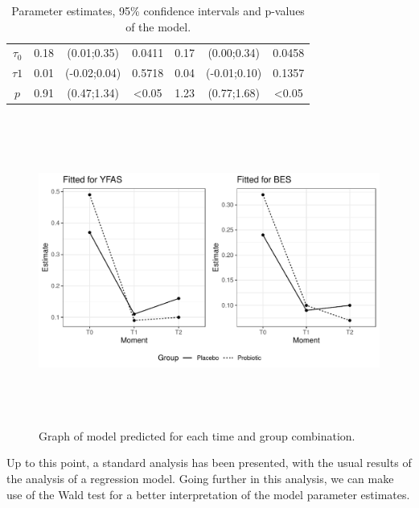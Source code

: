\documentclass[AMA,STIX1COL]{WileyNJD-v2}
\begin{document}
\begin{table}[h]
\begin{tabular}{c|cccccc}
$\tau_0$                   & 0.18       & (0.01;0.35)                                                       & \multicolumn{1}{c|}{0.0411} & 0.17       & (0.00;0.34)                                                       & 0.0458           \\
$\tau1$                    & 0.01       & (-0.02;0.04)                                                      & \multicolumn{1}{c|}{0.5718}           & 0.04       & (-0.01;0.10)                                                      & 0.1357           \\
$p$                        & 0.91       & (0.47;1.34)                                                       & \multicolumn{1}{c|}{\textless 0.05} & 1.23       & (0.77;1.68)                                                       & \textless 0.05 \\ \hline
\end{tabular}
\caption{Parameter estimates, 95\% confidence intervals and p-values of the model.}
\label{tab3}
\end{table}

\begin{figure}[h]
\centerline{\includegraphics[width=7in,height=4in]{FIGURE6}}
\caption{Graph of model predicted for each time and group combination.\label{fig6}}
\end{figure}

  
Up to this point, a standard analysis has been presented, with the usual results of the analysis of a regression model. Going further in this analysis, we can make use of the Wald test for a better interpretation of the model parameter estimates.
\end{document}
